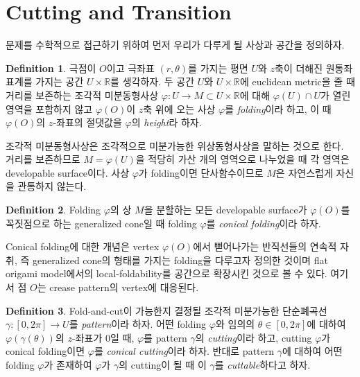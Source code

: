 \documentclass{amsart}
\theoremstyle{plain}
\theoremstyle{definition}
\newtheorem*{definition}{Definition}
\theoremstyle{remark}
\begin{document}
\section{Cutting and Transition}





 문제를 수학적으로 접근하기 위하여 먼저 우리가 다루게 될 사상과 공간을 정의하자.
 
\begin{definition}
극점이 $O$이고 극좌표 $(r,\theta)$를 가지는 평면 $U$와 $z$축이 더해진 원통좌표계를 가지는 공간 $U\times {\mathbb R}$를 생각하자.
두 공간 $U$와 $U\times{\mathbb R}$에 euclidean metric을 줄 때 거리를 보존하는 조각적 미분동형사상 $\varphi : U\to M\subset U\times {\mathbb R}$에 대해 $\varphi(U)\cap U$가 열린 영역을 포함하지 않고 $\varphi(O)$이 $z$축 위에 오는 사상 $\varphi$를 {\it folding}이라 하고, 이 때 $\varphi(O)$의 $z$-좌표의 절댓값을 $\varphi$의 {\it height}라 하자.
\end{definition}

조각적 미분동형사상은 조각적으로 미분가능한 위상동형사상을 말하는 것으로 한다.
거리를 보존하므로 $M=\varphi(U)$을 적당히 가산 개의 영역으로 나누었을 때 각 영역은 developable surface이다.
사상 $\varphi$가 folding이면 단사함수이므로 $M$은 자연스럽게 자신을 관통하지 않는다.

\begin{definition}
Folding $\varphi$의 상 $M$을 분할하는 모든 developable surface가 $\varphi(O)$를 꼭짓점으로 하는 generalized cone일 때 folding $\varphi$를 {\it conical folding}이라 하자.
\end{definition}

Conical folding에 대한 개념은 vertex $\varphi(O)$에서 뻗어나가는 반직선들의 연속적 자취, 즉 generalized cone의 형태를 가지는 folding을 다루고자 정의한 것이며 flat origami model에서의 local-foldability를 공간으로 확장시킨 것으로 볼 수 있다.
여기서 점 $O$는 crease pattern의 vertex에 대응된다.


\begin{definition}
Fold-and-cut이 가능한지 결정될 조각적 미분가능한 단순폐곡선 $\gamma : [0,2\pi]\to U$를 {\it pattern}이라 하자.
어떤 folding $\varphi$와 임의의 $\theta\in [0,2\pi]$에 대하여 $\varphi(\gamma(\theta))$의 $z$-좌표가 $0$일 때, $\varphi$를 pattern $\gamma$의 {\it cutting}이라 하고, cutting $\varphi$가 conical folding이면 $\varphi$를 {\it conical cutting}이라 하자.
반대로 pattern $\gamma$에 대하여 어떤 folding $\varphi$가 존재하여 $\varphi$가 $\gamma$의 cutting이 될 때 이 $\gamma$를 {\it cuttable}하다고 하자.
\end{definition}
\end{document}

